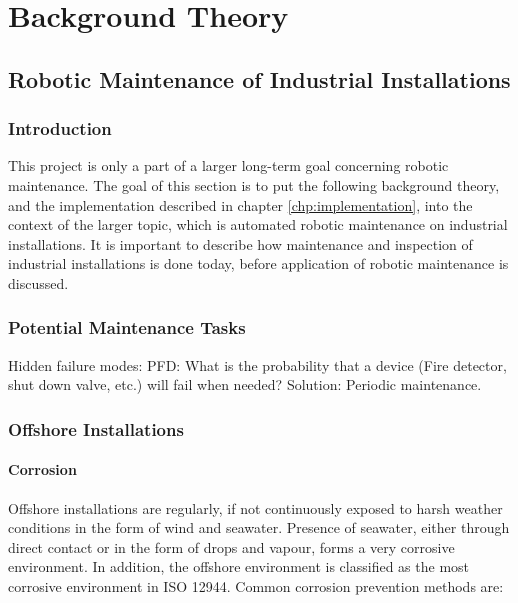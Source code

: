 \chapter{Background Theory}
\label{chp:theory} 


\section{Robotic Maintenance of Industrial Installations}

\subsection{Introduction}

This project is only a part of a larger long-term goal concerning robotic maintenance. The goal of this section is to put the following background theory, and the implementation described in chapter \ref{chp:implementation}, into the context of the larger topic, which is automated robotic maintenance on industrial installations. It is important to describe how maintenance and inspection of industrial installations is done today, before application of robotic maintenance is discussed.  

\subsection{Potential Maintenance Tasks}

Hidden failure modes: PFD: What is the probability that a device (Fire detector, shut down valve, etc.) will fail when needed? 
Solution: Periodic maintenance.

\subsection{Offshore Installations}

\subsubsection{Corrosion}

Offshore installations are regularly, if not continuously exposed to harsh weather conditions in the form of wind and seawater. Presence of seawater, either through direct contact or in the form of drops and vapour, forms a very corrosive environment. In addition, the offshore environment is classified as the most corrosive environment in ISO 12944\cite{ElReedy2012383}. Common corrosion prevention methods are\cite{ElReedy2012383}:

